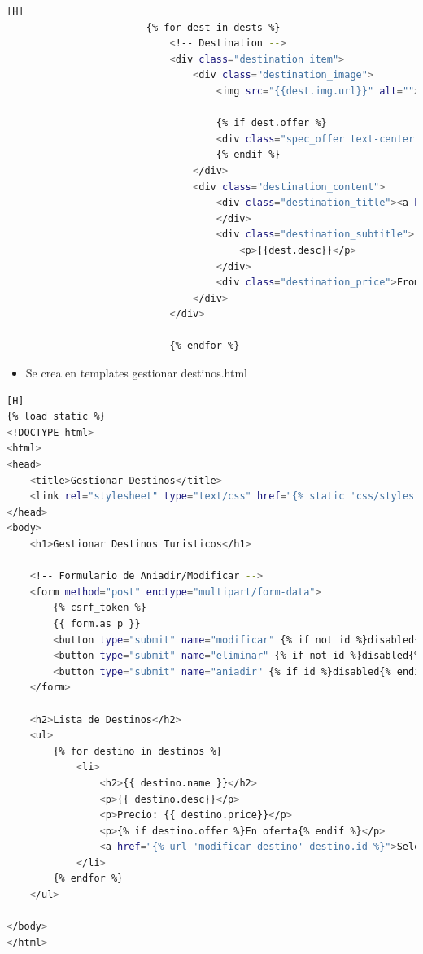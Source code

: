 \documentclass{article}
\begin{document}
	\begin{lstlisting}[language=bash,caption={Pedazo de html donde se usa  for e if}][H]
						{% for dest in dests %}
							<!-- Destination -->
							<div class="destination item">
								<div class="destination_image">
									<img src="{{dest.img.url}}" alt="">

									{% if dest.offer %}
									<div class="spec_offer text-center"><a href="#">Special Offer</a></div>
									{% endif %}
								</div>
								<div class="destination_content">
									<div class="destination_title"><a href="destinations.html">{{dest.name}}</a>
									</div>
									<div class="destination_subtitle">
										<p>{{dest.desc}}</p>
									</div>
									<div class="destination_price">From ${{dest.price}}</div>
								</div>
							</div>

							{% endfor %}

	\end{lstlisting}
	\begin{itemize}
		\item Se crea en templates gestionar destinos.html
	\end{itemize}	
	\begin{lstlisting}[language=bash,caption={Html de gestionar destinos.html}][H]
{% load static %}
<!DOCTYPE html>
<html>
<head>
    <title>Gestionar Destinos</title>
    <link rel="stylesheet" type="text/css" href="{% static 'css/styles.css' %}">
</head>
<body>
    <h1>Gestionar Destinos Turisticos</h1>
    
    <!-- Formulario de Aniadir/Modificar -->
    <form method="post" enctype="multipart/form-data">
        {% csrf_token %}
        {{ form.as_p }}
        <button type="submit" name="modificar" {% if not id %}disabled{% endif %}>Modificar</button>
        <button type="submit" name="eliminar" {% if not id %}disabled{% endif %}>Eliminar</button>
        <button type="submit" name="aniadir" {% if id %}disabled{% endif %}>Anadir</button>
    </form>
    
    <h2>Lista de Destinos</h2>
    <ul>
        {% for destino in destinos %}
            <li>
                <h2>{{ destino.name }}</h2>
                <p>{{ destino.desc}}</p>
                <p>Precio: {{ destino.price}}</p>
                <p>{% if destino.offer %}En oferta{% endif %}</p>
                <a href="{% url 'modificar_destino' destino.id %}">Seleccionar</a>
            </li>
        {% endfor %}
    </ul>
    
</body>
</html>
	\end{lstlisting}
\end{document}
